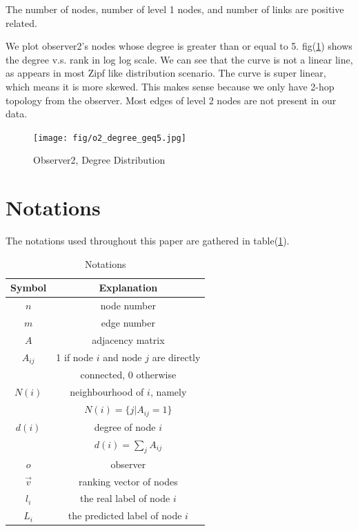 \documentclass[11pt,a4paper]{article}
\begin{document}
The number of nodes, number of level 1 nodes, and number of links
are positive related.

We plot observer2's nodes whose degree is greater than or equal to 5. 
fig(\ref{fig:o2_degree}) shows the degree v.s. rank in log log scale. 
We can see that the curve is not a linear line, as appears 
in most Zipf like distribution scenario. The curve is 
super linear, which means it is more skewed. This makes
sense because we only have 2-hop topology from the observer. 
Most edges of level 2 nodes are not present in our data. 

\begin{figure}
	\centering
	\texttt{[image: fig/o2\_degree\_geq5.jpg]}
	\caption{Observer2, Degree Distribution}
	\label{fig:o2_degree}
\end{figure}

\section{Notations}

The notations used throughout this paper are gathered 
in table(\ref{tbl:notation}). 

\begin{table}[htb]
	\centering
	\caption{Notations}
	\label{tbl:notation}
	\begin{tabular}{c|c}
	\hline
	Symbol & Explanation \\
	\hline
	$n$ & node number \\
	$m$ & edge number \\
	$A$ & adjacency matrix \\
	$A_{ij}$ & 1 if node $i$ and node $j$ are directly \\
	& connected, 0 otherwise\\
	$N(i)$ & neighbourhood of $i$, namely \\
	& $N(i) = \{j | A_{ij} = 1 \}$ \\
	$d(i)$ & degree of node $i$ \\
	& $d(i) = \sum_{j}{A_{ij}}$ \\
	$o$ & observer \\
	$\overrightarrow{v}$ & ranking vector of nodes \\
	$l_i$ & the real label of node $i$ \\
	$L_i$ & the predicted label of node $i$ \\
	\hline
	\end{tabular}
\end{table}
\end{document}
